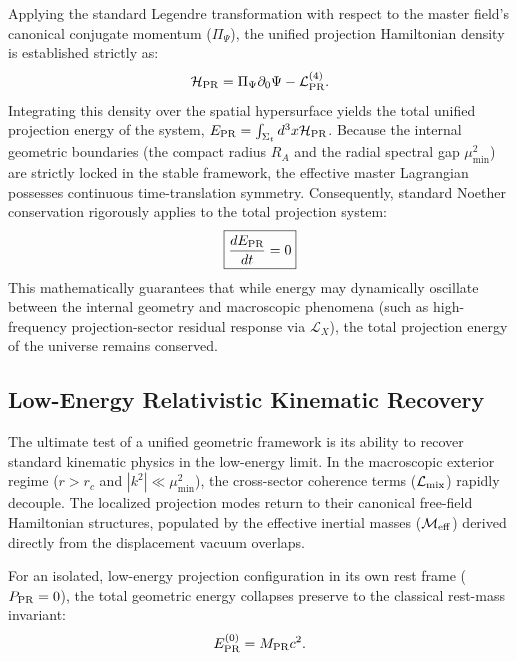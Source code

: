 \documentclass[11pt]{article}
\begin{document}
Applying the standard Legendre transformation \cite{goldstein2002} with respect to the master field's canonical conjugate momentum ($\Pi_\Psi$), the unified projection Hamiltonian density \cite{peskin1995} is established strictly as:
\begin{equation}
\mathcal{H}_{\rm PR} = \Pi_\Psi \partial_0 \Psi - \mathcal{L}_{\rm PR}^{(4)}.
\end{equation}
Integrating this density over the spatial hypersurface yields the total unified projection energy of the system, $E_{\rm PR} = \int_{\Sigma_t} d^3x \mathcal{H}_{\rm PR}$. Because the internal geometric boundaries (the compact radius $R_A$ and the radial spectral gap $\mu_{\min}^2$) are strictly locked in the stable framework, the effective master Lagrangian possesses continuous time-translation symmetry. Consequently, standard Noether conservation \cite{noether1918} rigorously applies to the total projection system:
\begin{equation}
\boxed{ \frac{d E_{\rm PR}}{dt} = 0 }
\end{equation}
This mathematically guarantees that while energy may dynamically oscillate between the internal geometry and macroscopic phenomena (such as high-frequency projection-sector residual response via $\mathcal{L}_X$), the total projection energy of the universe remains conserved.

\subsection{Low-Energy Relativistic Kinematic Recovery}
\label{sec:relativistic_kinematic_recovery}

The ultimate test of a unified geometric framework is its ability to recover standard kinematic physics in the low-energy limit. In the macroscopic exterior regime ($r > r_c$ and $|k^2| \ll \mu_{\min}^2$), the cross-sector coherence terms ($\mathcal{L}_{\rm mix}$) rapidly decouple. The localized projection modes return to their canonical free-field Hamiltonian structures, populated by the effective inertial masses ($\mathcal M_{\rm eff}$) derived directly from the displacement vacuum overlaps.

For an isolated, low-energy projection configuration in its own rest frame ($P_{\rm PR} = 0$), the total geometric energy collapses preserve to the classical rest-mass invariant:
\begin{equation}
E_{\rm PR}^{(0)} = M_{\rm PR} c^2.
\end{equation}
\end{document}
